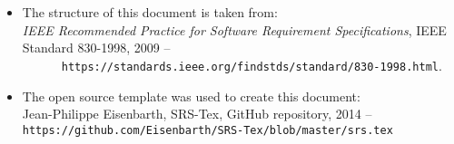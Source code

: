 
\begin{itemize}
   \item The structure of this document is taken from: \\
      \textit{IEEE Recommended Practice for Software Requirement
      Specifications}, IEEE Standard 830-1998, 2009 -- \nolinkurl{
      https://standards.ieee.org/findstds/standard/830-1998.html}.
   \item The open source template was used to create this document: \\
      Jean-Philippe Eisenbarth, SRS-Tex, GitHub repository, 2014 -- 
      \nolinkurl{https://github.com/Eisenbarth/SRS-Tex/blob/master/srs.tex}
\end{itemize}
